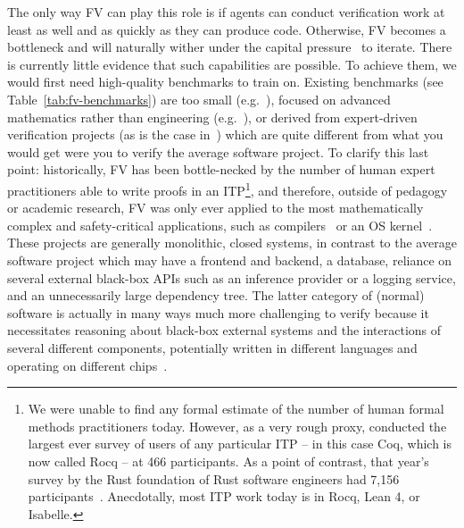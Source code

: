 The only way FV can play this role is if agents can conduct verification work
at least as well and as quickly as they can produce code. Otherwise, FV becomes a bottleneck and will naturally wither under the capital pressure~\cite{rasmussen1997risk} to iterate. There is currently little evidence that such capabilities are possible. To achieve them, we would first need high-quality benchmarks to train on. Existing benchmarks (see Table~\ref{tab:fv-benchmarks}) 
are too small (e.g.~\cite{loughridge2024dafnybench}),
focused on advanced mathematics rather than engineering (e.g.~\cite{glazer2024frontiermath}),
or derived from expert-driven verification projects (as is the case in~\cite{chakraborty2024neural}) which 
are quite different from what you would get were you to verify the average software project.
To clarify this last point: 
    historically, FV has been bottle-necked by the number of human expert practitioners able to write proofs in an ITP\footnote{We were unable to find any formal estimate of the number of human formal methods practitioners today. However, as a very rough proxy, \citet{de2025lessons} conducted the largest ever survey of users of any particular ITP -- in this case Coq, which is now called Rocq -- at 466 participants. As a point of contrast, that year's survey by the Rust foundation of Rust software engineers had 7,156 participants~\cite{rustParticipants}. Anecdotally, most ITP work today is in Rocq, Lean 4, or Isabelle.}, and therefore, outside of pedagogy or academic research, FV was only ever applied to the most mathematically complex and safety-critical applications, such as compilers~\cite{leroy2016compcert} or
    an OS kernel~\cite{klein2009sel4}.
    These projects are generally monolithic, closed systems, 
    in contrast to the average
    software project which may have a frontend and backend, a database, 
    reliance on several external black-box APIs 
    such as an inference provider or a logging service, 
    and an unnecessarily large dependency tree.
The latter category of (normal) software is actually in many ways much more challenging 
to verify because it necessitates reasoning about black-box external systems and 
the interactions of several different components, 
potentially written in different languages 
and operating on different chips~\cite{buro2020equational,perconti2014verifying}.


